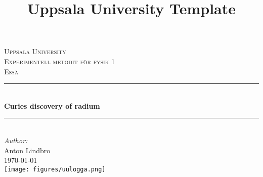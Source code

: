 \documentclass[12pt]{article}
\title{Uppsala University Template}
\begin{document}
\begin{titlepage}

\newcommand{\HRule}{\rule{\linewidth}{0.5mm}} %

\begin{center}
\textsc{\LARGE Uppsala University}\\[1.5cm] %
\textsc{\Large Experimentell metodit för fysik 1}\\[0.5cm] %
\textsc{\large Essä}\\[0.5cm] %

\HRule \\[0.4cm]
{ \huge \bfseries Curies discovery of radium}\\[0.4cm] %
\HRule \\[1.5cm]
 

\large\emph{Author:}\\ Anton Lindbro\\[1.0cm]%




{\large \today}\\[1cm] %

\texttt{[image: figures/uulogga.png]}\\%
\end{center}
\end{titlepage}
\pagebreak
    
\end{document}
